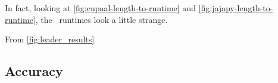 In fact, looking at \autoref{fig:cupaal-length-to-runtime} and \autoref{fig:jajapy-length-to-runtime}, the \Cupaal\ runtimes look a little strange.






From \autoref{fig:leader_results}




\subsection{Accuracy}\label{subsec:accuracy}
